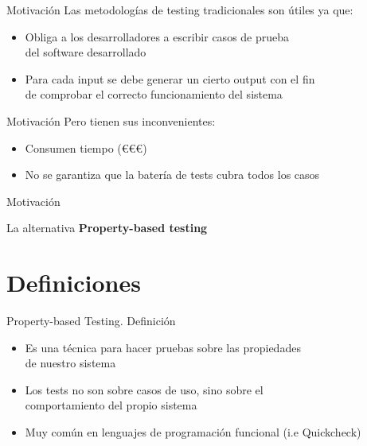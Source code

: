 \documentclass{beamer}
\begin{document}
    \begin{frame}{Motivación}
      Las metodologías de testing tradicionales son útiles ya que:
      \begin{itemize}
        \item Obliga a los desarrolladores a escribir casos de prueba\\
        del software desarrollado
        \item Para cada input se debe generar un cierto output con el fin\\
        de comprobar el correcto funcionamiento del sistema
      \end{itemize}
    \end{frame}

    \begin{frame}{Motivación}
      Pero tienen sus inconvenientes:
      \begin{itemize}
        \item Consumen tiempo (€€€)
        \item No se garantiza que la batería de tests cubra todos los casos
      \end{itemize}
    \end{frame}

    \begin{frame}{Motivación}
      \begin{exampleblock}{La alternativa}
        \textbf{Property-based testing}
      \end{exampleblock}
    \end{frame}

  \section{Definiciones}
    \begin{frame}{Property-based Testing. Definición}
      \begin{itemize}
        \item Es una técnica para hacer pruebas sobre las propiedades\\
        de nuestro sistema
        \item Los tests no son sobre casos de uso, sino sobre el\\
        comportamiento del propio sistema
        \item Muy común en lenguajes de programación funcional (i.e Quickcheck)
      \end{itemize}
    \end{frame}
\end{document}

